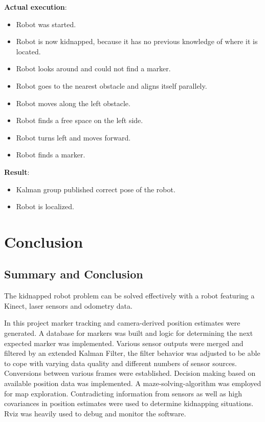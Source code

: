 \begin{enumerate}
\textbf{Actual execution}:
\begin{itemize}
\item Robot was started.
\item Robot is now kidnapped, because it has no previous knowledge of where it is located.
\item Robot looks around and could not find a marker. 
\item Robot goes to the nearest obstacle and aligns itself parallely.
\item Robot moves along the left obstacle.
\item Robot finds a free space on the left side.
\item Robot turns left and moves forward.
\item Robot finds a marker.
\end{itemize} 

\textbf{Result}:
\begin{itemize}
\item Kalman group published correct pose of the robot.
\item Robot is localized.
\end{itemize}

\end{enumerate}

\chapter{Conclusion}
\section{Summary and Conclusion}
The kidnapped robot problem can be solved effectively with a robot featuring a Kinect, laser sensors and odometry data.

In this project marker tracking and camera-derived position estimates were generated. A database for markers was built and logic for determining the next expected marker was implemented. Various sensor outputs were merged and filtered by an extended Kalman Filter, the filter behavior was adjusted to be able to cope with varying data quality and different numbers of sensor sources. Conversions between various frames were established. Decision making based on available position data was implemented. A maze-solving-algorithm was employed for map exploration. Contradicting information from sensors as well as high covariances in position estimates were used to determine kidnapping situations. Rviz was heavily used to debug and monitor the software.

